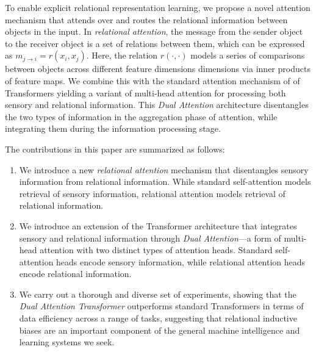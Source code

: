 To enable explicit relational representation learning, we propose a novel attention mechanism that attends over and routes the relational information between objects in the input. In \textit{relational attention}, the message from the sender object to the receiver object is a set of relations between them, which can be expressed as $m_{j \to i} = r(x_i, x_j)$. Here, the relation $r(\cdot, \cdot)$ models a series of comparisons between objects across different feature dimensions dimensions via inner products of feature maps. We combine this with the standard attention mechanism of of Transformers yielding a variant of multi-head attention for processing both sensory and relational information. This \textit{Dual Attention} architecture disentangles the two types of information in the aggregation phase of attention, while integrating them during the information processing stage.

The contributions in this paper are summarized as follows:
\begin{enumerate}
  \item We introduce a new \textit{relational attention} mechanism that disentangles sensory information from relational information. While standard self-attention models retrieval of sensory information, relational attention models retrieval of relational information.
  \item We introduce an extension of the Transformer architecture that integrates sensory and relational information through \textit{Dual Attention}---a form of multi-head attention with two distinct types of attention heads. Standard self-attention heads encode sensory information, while relational attention heads encode relational information.
  \item We carry out a thorough and diverse set of experiments, showing that the \textit{Dual Attention Transformer} outperforms standard Transformers in terms of data efficiency across a range of tasks, suggesting that relational inductive biases are an important component of the general machine intelligence and learning systems we seek.
\end{enumerate}

